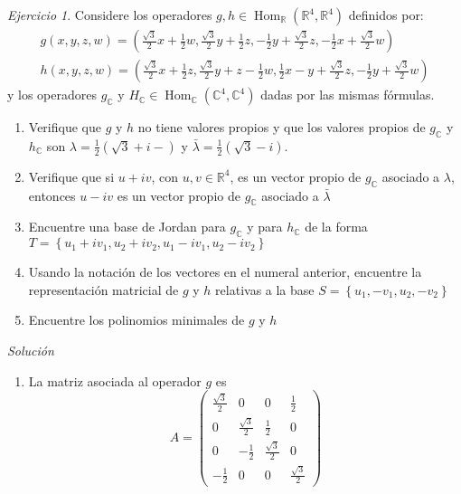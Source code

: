\documentclass[11pt,a4paper]{article}
\theoremstyle{definition}
\theoremstyle{remark}
\newtheorem{exc}{Ejercicio}
\newcommand{\set}[1]{\left\lbrace #1 \right\rbrace}
\newcommand{\RR}{\mathbb{R}}
\newcommand{\Hom}{\operatorname{Hom}}
\newcommand{\CC}{\mathbb{C}}
\begin{document}
\begin{exc}
	Considere los operadores $ g,h \in \Hom_\RR (\RR^4, \RR^4) $ definidos por:
	\begin{align*}
	g(x,y,z,w) = \left( \frac{\sqrt{3}}{2}x + \frac{1}{2}w, \frac{\sqrt{3}}{2}y + \frac{1}{2}z, -\frac{1}{2}y + \frac{\sqrt{3}}{2}z, - \frac{1}{2}x + \frac{\sqrt{3}}{2} w \right) \\
	h(x,y,z,w) = \left( \frac{\sqrt{3}}{2}x + \frac{1}{2}z, \frac{\sqrt{3}}{2}y +z - \frac{1}{2}w, \frac{1}{2}x-y+ \frac{\sqrt{3}}{2}z, - \frac{1}{2}y + \frac{\sqrt{3}}{2}w \right)	\end{align*}
	y los operadores $ g_\CC $ y $  H_\CC \in \Hom_\CC ( \CC^4, \CC^4) $ dadas por las mismas fórmulas.
	\begin{enumerate}
		\item Verifique que $ g $ y $ h $ no tiene valores propios y que los valores propios de $ g_\CC $ y $ h_\CC $ son $ \lambda = \frac{1}{2}(\sqrt{3} + i-) $ y $ \bar{\lambda} = \frac{1}{2}(\sqrt{3} - i) $.
		\item Verifique que si $ u + iv $, con $ u,v \in \RR^4 $, es un vector propio de $ g_\CC $ asociado a $ \lambda $, entonces $ u - iv $ es un vector propio de $ g_\CC $ asociado a $ \bar{\lambda} $
		\item Encuentre una base de Jordan para $ g_\CC $ y para $ h_\CC $ de la forma $ T = \set{u_1 + i v_1, u_2 + i v_2, u_1 - i v_1, u_2 - iv_2 } $
		\item Usando la notación de los vectores en el numeral anterior, encuentre la representación matricial de $ g $ y $ h $ relativas a la base $ S = \set{u_1, - v_1, u_2, -v_2} $ 
		\item Encuentre los polinomios minimales de $ g $ y $ h $
	\end{enumerate}
	\textit{Solución}
	\begin{enumerate}
	\item La matriz asociada al operador $ g $ es 
	\begin{equation}
	A= \begin{pmatrix}
	\frac{\sqrt{3}}{2} & 0 & 0 & \frac{1}{2}
	\\ 0 & \frac{\sqrt{3}}{2} & \frac{1}{2} & 0 
	\\ 0 & -\frac{1}{2} & \frac{\sqrt{3}}{2} & 0
	\\ -\frac{1}{2} & 0 & 0 & \frac{\sqrt{3}}{2}
	\end{pmatrix} \nonumber
	\end{equation}
	

\end{enumerate}
\end{exc}
\end{document}
